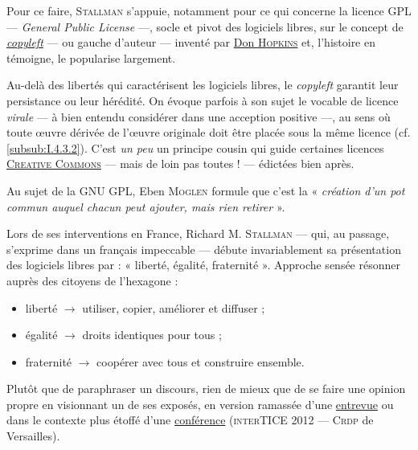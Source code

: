 \label{page:copyleft}%
Pour ce faire, \textsc{Stallman} s'appuie, notamment pour ce qui concerne la licence GPL --- \textit{General Public License} ---, socle et pivot des logiciels libres, sur le concept de \href{https://fr.wikipedia.org/wiki/Copyleft}{\textit{copyleft}} --- ou gauche d'auteur --- inventé par \href{https://fr.wikipedia.org/wiki/Don_Hopkins}{Don \textsc{Hopkins}} et, l'histoire en témoigne, le popularise largement.

Au-delà des libertés qui caractérisent les logiciels libres, le \textit{\gls{copyleft}} garantit leur persistance ou leur hérédité. On évoque parfois à son sujet le vocable de licence \emph{virale} --- à bien entendu considérer dans une acception positive ---, au sens où toute œuvre dérivée de l’œuvre originale doit être placée sous la même licence (cf. \cref{subsub:I.4.3.2}). C'est \emph{un peu} un principe cousin qui guide certaines licences \href{https://creativecommons.org/licenses/?lang=fr-FR}{\textsc{Creative Commons}} --- mais de loin pas toutes ! --- édictées bien après.

Au sujet de la GNU GPL, Eben \textsc{Moglen} formule que c'est la « \textit{création d'un pot commun auquel chacun peut ajouter, mais rien retirer} ».

Lors de ses interventions en France, Richard M. \textsc{Stallman} --- qui, au passage, s'exprime dans un français impeccable --- débute invariablement sa présentation des logiciels libres par : « liberté, égalité, fraternité ». Approche sensée résonner auprès des citoyens de l'hexagone :
\begin{itemize}
	\item liberté $\rightarrow$ utiliser, copier, améliorer et diffuser ;
	\item égalité $\rightarrow$ droits identiques pour tous ;
	\item fraternité $\rightarrow$  coopérer avec tous et construire ensemble.
\end{itemize}

Plutôt que de paraphraser un discours, rien de mieux que de se faire une opinion propre en visionnant un de ses exposés, en version ramassée d'une \href{./Videos/Chapter01/stallmann-entrevue-2012.mp4}{entrevue} ou dans le contexte plus étoffé d'une \href{./Videos/Chapter01/stallmann-intertice-cc-by-nc--sa-2012.mp4}{conférence} (\textsc{interTICE} 2012 --- \textsc{Crdp} de Versailles).

